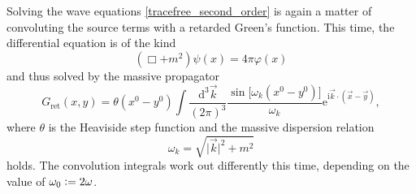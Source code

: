 Solving the wave equations \eqref{tracefree_second_order} is again a matter of convoluting the source terms with a retarded Green's function. This time, the differential equation is of the kind
\begin{equation}
  (\Box + m^2)\psi(x) = 4\pi\varphi(x)
\end{equation}
and thus solved by the massive propagator\cite{}
\begin{equation}
  G_\text{ret}(x,y) = \theta(x^0-y^0)\int\frac{\mathrm d^3\vec k}{(2\pi)^3}\frac{\operatorname{sin}\lbrack\omega_k(x^0-y^0)\rbrack}{\omega_k} \mathrm e^{\mathrm i\vec k\cdot(\vec x-\vec y)},
\end{equation}
where $\theta$ is the Heaviside step function and the massive dispersion relation
\begin{equation}
  \omega_k = \sqrt{\lvert\vec k\rvert^2 + m^2}
\end{equation}
holds. The convolution integrals work out differently this time, depending on the value of $\omega_0 \vcentcolon= 2\omega$.
